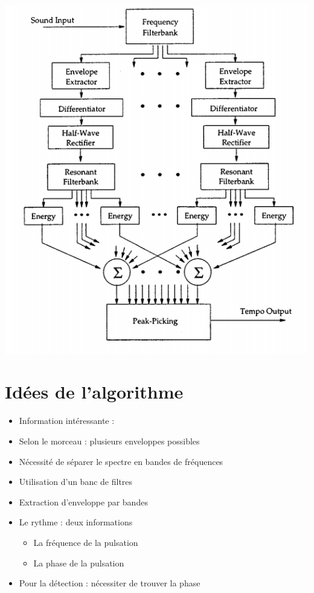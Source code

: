 \documentclass{beamer}
\begin{document}
\begin{frame}
\begin{center}
 \includegraphics[scale = 0.3]{Algo.png}
\end{center}
 \end{frame}
 


 \section{Idées de l'algorithme}
 \begin{frame}
       \tableofcontents[currentsection]
\end{frame}


 \begin{frame}
  \begin{itemize}
  \item Information intéressante : 
  \item<3-> Selon le morceau : plusieurs enveloppes possibles
  \item<4-> Nécessité de séparer le spectre en bandes de fréquences
  \item<5-> Utilisation d'un banc de filtres
  \item<6-> Extraction d'enveloppe par bandes
  \end{itemize}
 \end{frame}

 \begin{frame}
  \begin{itemize}
   \item Le rythme : deux informations
   \begin{itemize}
   \item<2-> La fréquence de la pulsation
   \item<3-> La phase de la pulsation
   \end{itemize}
   \item<4-> Pour la détection : nécessiter de trouver la phase
  \end{itemize}

 \end{frame}
\end{document}
